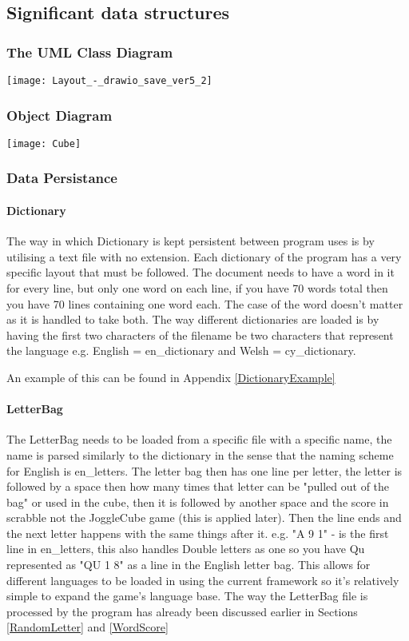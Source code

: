 \subsection{Significant data structures}
\subsubsection{The UML Class Diagram}
\begin{sideways}
        \texttt{[image: Layout\_-\_drawio\_save\_ver5\_2]}
\end{sideways}
        \newpage
    \subsubsection{Object Diagram}
        \texttt{[image: Cube]}
    \subsubsection{Data Persistance}
        \paragraph{Dictionary}
        The way in which Dictionary is kept persistent between program uses is by utilising a text file with no extension. Each dictionary of the program has a very specific layout that must be followed. The document needs to have a word in it for every line, but only one word on each line, if you have 70 words total then you have 70 lines containing one word each. The case of the word doesn't matter as it is handled to take both. The way different dictionaries are loaded is by having the first two characters of the filename be two characters that represent the language e.g. English = en\_dictionary and Welsh = cy\_dictionary.
        
        An example of this can be found in Appendix \ref{DictionaryExample}
        \paragraph{LetterBag}
        The LetterBag needs to be loaded from a specific file with a specific name, the name is parsed similarly to the dictionary in the sense that the naming scheme for English is en\_letters. The letter bag then has one line per letter, the letter is followed by a space then how many times that letter can be "pulled out of the bag" or used in the cube, then it is followed by another space and the score in scrabble not the JoggleCube game (this is applied later). Then the line ends and the next letter happens with the same things after it. e.g. "A 9 1" - is the first line in en\_letters, this also handles Double letters as one so you have Qu represented as "QU 1 8" as a line in the English letter bag. This allows for different languages to be loaded in using the current framework so it's relatively simple to expand the game's language base. The way the LetterBag file is processed by the program has already been discussed earlier in Sections \ref{RandomLetter} and \ref{WordScore}
        
